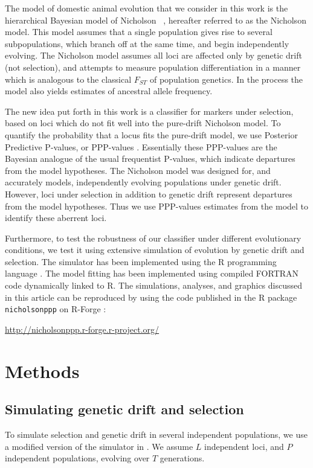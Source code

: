 \documentclass[a4paper,12pt]{article}
\begin{document}
The model of domestic animal evolution that we consider in this work
is the hierarchical Bayesian model of Nicholson \etal\
\cite{nicholson}, hereafter referred to as the Nicholson model. This
model assumes that a single population gives rise to several
subpopulations, which branch off at the same time, and begin
independently evolving. The Nicholson model assumes all loci are
affected only by genetic drift (not selection), and attempts to
measure population differentiation in a manner which is analogous to
the classical $F_{ST}$ of population genetics. In the process the
model also yields estimates of ancestral allele frequency.

The new idea put forth in this work is a classifier for markers under
selection, based on loci which do not fit well into the pure-drift
Nicholson model. To quantify the probability that a locus fits the
pure-drift model, we use Posterior Predictive P-values, or PPP-values
\cite{pppvalues}. Essentially these PPP-values are the Bayesian
analogue of the usual frequentist P-values, which indicate departures
from the model hypotheses. The Nicholson model was designed for, and
accurately models, independently evolving populations under genetic
drift. However, loci under selection in addition to genetic drift
represent departures from the model hypotheses. Thus we use PPP-values
estimates from the model to identify these aberrent loci.

Furthermore, to test the robustness of our classifier under different
evolutionary conditions, we test it using extensive simulation of
evolution by genetic drift and selection. The simulator has been
implemented using the R programming language \cite{R}. The model
fitting has been implemented using compiled FORTRAN code dynamically
linked to R. The simulations, analyses, and graphics discussed in this
article can be reproduced by using the code published in the R package
\texttt{nicholsonppp} on R-Forge \cite{R-Forge}:

 \url{http://nicholsonppp.r-forge.r-project.org/}

\section{Methods}

\subsection{Simulating genetic drift and selection}

To simulate selection and genetic drift in several independent
populations, we use a modified version of the simulator in
\cite{Beaumont-Balding}. We assume $L$ independent loci, and $P$
independent populations, evolving over $T$ generations.
\end{document}

